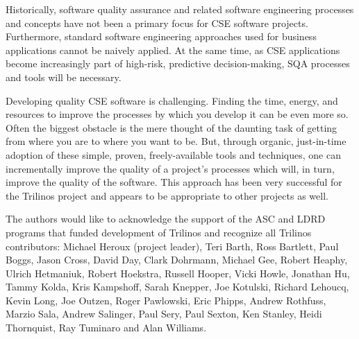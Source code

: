 \documentclass{doublecol}
\begin{document}
Historically, software quality assurance and related software
engineering processes and concepts have not been a primary focus for
CSE software projects.  Furthermore, standard software engineering
approaches used for business applications cannot be naively applied.
At the same time, as CSE applications become increasingly part of
high-risk, predictive decision-making, SQA processes and tools will
be necessary.

Developing quality CSE software is challenging. Finding the time,
energy, and resources to improve the processes by which you develop
it can be even more so. Often the biggest obstacle is the mere
thought of the daunting task of getting from where you are to where
you want to be. But, through organic, just-in-time adoption of these
simple, proven, freely-available tools and techniques, one can
incrementally improve the quality of a project's processes which
will, in turn, improve the quality of the software.  This approach
has been very successful for the Trilinos project and appears to be
appropriate to other projects as well.



The authors would like to acknowledge the support of the ASC and
LDRD programs that funded development of Trilinos and recognize all
Trilinos contributors: Michael Heroux (project leader), Teri Barth,
Ross Bartlett, Paul Boggs, Jason Cross, David Day, Clark Dohrmann,
Michael Gee, Robert Heaphy, Ulrich Hetmaniuk, Robert Hoekstra,
Russell Hooper, Vicki Howle, Jonathan Hu, Tammy Kolda, Kris
Kampshoff, Sarah Knepper, Joe Kotulski, Richard Lehoucq, Kevin Long,
Joe Outzen, Roger Pawlowski, Eric Phipps, Andrew Rothfuss, Marzio
Sala, Andrew Salinger, Paul Sery, Paul Sexton, Ken Stanley, Heidi
Thornquist, Ray Tuminaro and Alan Williams.



\end{document}
